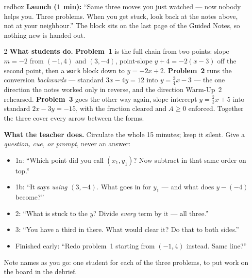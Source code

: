 \documentclass[10pt]{article}
\begin{document}
\begin{skillbox}{redbox}
\textbf{Launch (1 min):} ``Same three moves you just watched --- now nobody helps you. Three
problems. When you get stuck, look back at the notes above, not at your neighbour.'' The block sits
on the last page of the Guided Notes, so nothing new is handed out.
\begin{multicols}{2}
\textbf{What students do.} \textbf{Problem~1} is the full chain from two points: slope
$m=-2$ from $(-1,4)$ and $(3,-4)$, point-slope $y+4=-2(x-3)$ off the second point, then a
\texttt{work} block down to $y=-2x+2$. \textbf{Problem~2} runs the conversion \emph{backwards} ---
standard $3x-4y=12$ into $y=\tfrac34x-3$ --- the one direction the notes worked only in reverse, and
the direction Warm-Up~2 rehearsed. \textbf{Problem~3} goes the other way again, slope-intercept
$y=\tfrac23x+5$ into standard $2x-3y=-15$, with the fraction cleared and $A\ge0$ enforced.
Together the three cover every arrow between the forms.

\columnbreak
\textbf{What the teacher does.} Circulate the whole 15 minutes; keep it silent. Give a
\emph{question, cue, or prompt}, never an answer:
\begin{itemize}[leftmargin=1.1em, nosep]
  \item 1a: ``Which point did you call $(x_1,y_1)$? Now subtract in that same order on top.''
  \item 1b: ``It says \emph{using $(3,-4)$}. What goes in for $y_1$ --- and what does $y-(-4)$ become?''
  \item 2: ``What is stuck to the $y$? Divide \emph{every} term by it --- all three.''
  \item 3: ``You have a third in there. What would clear it? Do that to both sides.''
  \item Finished early: ``Redo problem~1 starting from $(-1,4)$ instead. Same line?''
\end{itemize}
Note names as you go: one student for each of the three problems, to put work on the board in the
debrief.
\end{multicols}
\end{skillbox}
\end{document}
